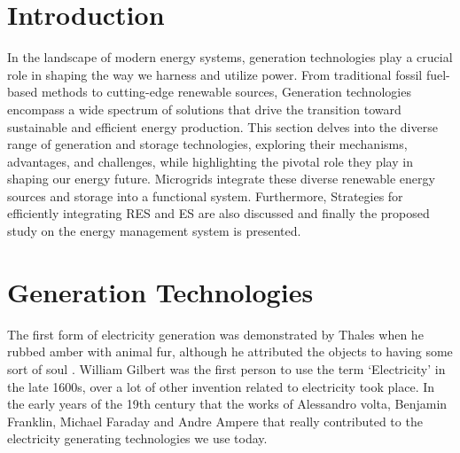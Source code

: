 \section{Introduction}
In the landscape of modern energy systems, generation technologies play a crucial role in shaping the way we harness and utilize power. From traditional fossil fuel-based methods to cutting-edge renewable sources, Generation technologies encompass a wide spectrum of solutions that drive the transition toward sustainable and efficient energy production. This section delves into the diverse range of generation and storage technologies, exploring their mechanisms, advantages, and challenges, while highlighting the pivotal role they play in shaping our energy future. Microgrids integrate these diverse renewable energy sources and storage into a functional system. Furthermore, Strategies for efficiently integrating RES and ES are also discussed and finally the proposed study on the energy management system is presented.\par
\section{Generation Technologies}
The first form of electricity generation was demonstrated by Thales when he rubbed amber with animal fur, although he attributed the objects to having some sort of soul \cite{6}. William Gilbert was the first person to use the term ‘Electricity’ in the late 1600s, over a lot of other invention related to electricity took place. In the early years of the 19th century that the works of Alessandro volta, Benjamin Franklin, Michael Faraday and Andre Ampere that really contributed to the electricity generating technologies we use today.\par
